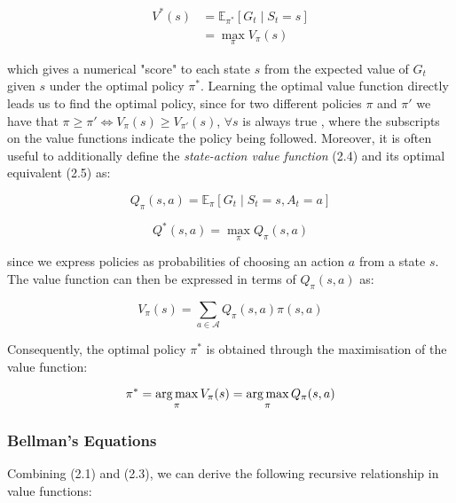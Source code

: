 \documentclass[12pt,twoside]{report}
\begin{document}
\begin{equation}
\begin{split}
        V^*(s) & = \mathbb{E}_{\pi^*}\left[G_t \! \mid \! S_t = s \right] \\
        & = \max_{\pi} V_\pi(s)
\end{split}
\end{equation}

\noindent which gives a numerical "score" to each state $s$ from the expected value of $G_t$ given $s$ under the optimal policy $\pi^*$. Learning the optimal value function directly leads us to find the optimal policy, since for two different policies $\pi$ and $\pi'$ we have that $\pi \geq \pi' \Longleftrightarrow V_{\pi}(s) \geq V_{\pi'}(s)$, $\forall s$ is always true \cite{Sutton1998}, where the subscripts on the value functions indicate the policy being followed. Moreover, it is often useful to additionally define the \textit{state-action value function} (2.4) and its optimal equivalent (2.5) as:

\begin{equation}
    Q_\pi(s,a) = \mathbb{E}_{\pi}\left[G_t \! \mid \! S_t = s, A_t = a \right] 
\end{equation}

\begin{equation}
     Q^*(s,a) = \max_{\pi} Q_\pi(s,a)
\end{equation}

\noindent since we express policies as probabilities of choosing an action $a$ from a state $s$. The value function can then be expressed in terms of $Q_\pi(s,a)$ as:

\begin{equation}
    V_\pi(s) = \sum_{a \in \mathcal{A}} Q_\pi(s,a)\pi(s,a)
\end{equation}

Consequently, the optimal policy $\pi^*$ is obtained through the maximisation of the value function: 

\begin{equation}
    \pi^* = \operatorname*{arg\,max}_\pi V_\pi(s) = \operatorname*{arg\,max}_\pi Q_\pi(s,a)
\end{equation}

\subsubsection{Bellman's Equations}

Combining (2.1) and (2.3), we can derive the following recursive relationship in value functions: 
\end{document}
